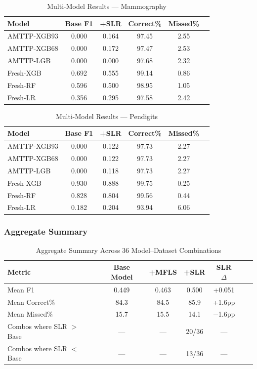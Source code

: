 \documentclass[journal]{IEEEtran}
\begin{document}
\begin{table}[!t]
\centering
\caption{Multi-Model Results --- Mammography}
\label{tab:multi_mammo}
\setlength{\tabcolsep}{3pt}
\begin{tabular}{@{}lccccc@{}}
\toprule
\textbf{Model} & \textbf{Base F1} & \textbf{+SLR} & \textbf{Correct\%} & \textbf{Missed\%} \\
\midrule
AMTTP-XGB93 & 0.000 & 0.164 & 97.45 & 2.55 \\
AMTTP-XGB68 & 0.000 & 0.172 & 97.47 & 2.53 \\
AMTTP-LGB   & 0.000 & 0.000 & 97.68 & 2.32 \\
Fresh-XGB   & 0.692 & 0.555 & 99.14 & 0.86 \\
Fresh-RF    & 0.596 & 0.500 & 98.95 & 1.05 \\
Fresh-LR    & 0.356 & 0.295 & 97.58 & 2.42 \\
\bottomrule
\end{tabular}
\end{table}

\begin{table}[!t]
\centering
\caption{Multi-Model Results --- Pendigits}
\label{tab:multi_pendigits}
\setlength{\tabcolsep}{3pt}
\begin{tabular}{@{}lccccc@{}}
\toprule
\textbf{Model} & \textbf{Base F1} & \textbf{+SLR} & \textbf{Correct\%} & \textbf{Missed\%} \\
\midrule
AMTTP-XGB93 & 0.000 & 0.122 & 97.73 & 2.27 \\
AMTTP-XGB68 & 0.000 & 0.122 & 97.73 & 2.27 \\
AMTTP-LGB   & 0.000 & 0.118 & 97.73 & 2.27 \\
Fresh-XGB   & 0.930 & 0.888 & 99.75 & 0.25 \\
Fresh-RF    & 0.828 & 0.804 & 99.56 & 0.44 \\
Fresh-LR    & 0.182 & 0.204 & 93.94 & 6.06 \\
\bottomrule
\end{tabular}
\end{table}

\subsubsection{Aggregate Summary}

\begin{table}[!t]
\centering
\caption{Aggregate Summary Across 36 Model--Dataset Combinations}
\label{tab:aggregate}
\begin{tabular}{@{}lcccccc@{}}
\toprule
\textbf{Metric} & \textbf{Base Model} & \textbf{+MFLS} & \textbf{+SLR} & \textbf{SLR $\Delta$} \\
\midrule
Mean F1        & 0.449 & 0.463 & 0.500 & +0.051 \\
Mean Correct\% & 84.3  & 84.5  & 85.9  & +1.6pp \\
Mean Missed\%  & 15.7  & 15.5  & 14.1  & $-$1.6pp \\
Combos where SLR $>$ Base & --- & --- & 20/36 & --- \\
Combos where SLR $<$ Base & --- & --- & 13/36 & --- \\
\bottomrule
\end{tabular}
\end{table}
\end{document}
